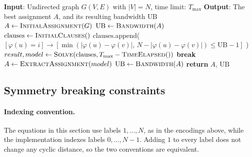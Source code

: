 \documentclass[a4paper,fleqn]{cas-sc}
\begin{document}
        \begin{algorithm}[H]
            \caption{Pseudocode of Incremental SAT for the cyclic bandwidth problem}
            \begin{algorithmic}[1]
                \State \textbf{Input}: Undirected graph $G(V,E)$ with $|V|=N$, time limit: $T_{\max}$
                \State \textbf{Output}: The best assignment $A$, and its resulting bandwidth $\text{UB}$
                \Statex
                \State $A \gets \textsc{InitialAssignment}(G)$ 
                \State $\text{UB} \gets \textsc{Bandwidth}(A)$
                \State $\text{clauses} \gets \textsc{InitialClauses}()$ 
                \Statex
                            \State $\text{clauses}$.append( $[\varphi(u)=i] \rightarrow [\min(|\varphi(u)-\varphi(v)|,\, N-|\varphi(u)-\varphi(v)|) \le \text{UB}-1]$ )
                        \EndFor
                    \EndFor
                    \Statex
                    \State $result, model \gets \textsc{Solve}(\text{clauses}, T_{\max}-\textsc{TimeElapsed}())$
                        \State \textbf{break} 
                    \EndIf
                    \Statex
                    \State $A \gets \textsc{ExtractAssignment}(model)$
                    \State $\text{UB} \gets \textsc{Bandwidth}(A)$ 
                \EndWhile
                \Statex
                \State \textbf{return} $A$, $\text{UB}$
            \end{algorithmic}
        \end{algorithm}

    \subsection{Symmetry breaking constraints}

        \vspace{1em}

        \paragraph{\textbf{Indexing convention.}}
        The equations in this section use labels $1,\dots,N$, as in the encodings above, while the implementation indexes labels $0,\dots,N-1$. Adding $1$ to every label does not change any cyclic distance, so the two conventions are equivalent.
\end{document}
